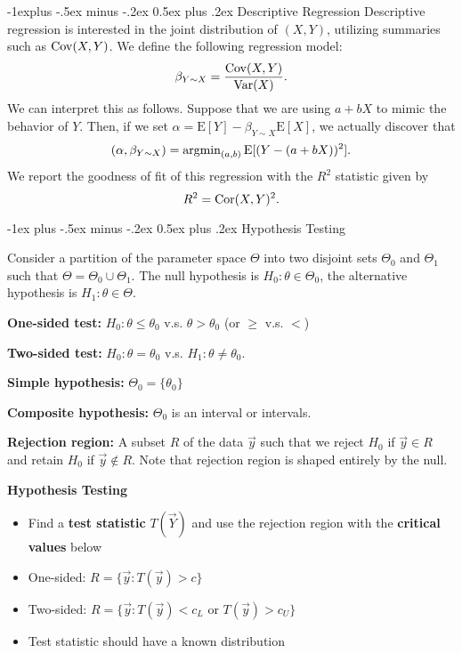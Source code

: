 \documentclass[10pt,landscape]{article}
\makeatletter
\renewcommand{\section}{\@startsection{section}{1}{0mm}%
                                {-1ex plus -.5ex minus -.2ex}%
                                {0.5ex plus .2ex}%
                                {\normalfont\large\bfseries}}
\renewcommand{\subsection}{\@startsection{subsection}{2}{0mm}%
                                {-1explus -.5ex minus -.2ex}%
                                {0.5ex plus .2ex}%
                                {\normalfont\normalsize\bfseries}}
\newcommand{\E}{\text{E}}
\makeatother
\begin{document}
\begin{multicols*}{3}
\subsection{Descriptive Regression}
Descriptive regression is interested
in the joint distribution of $(X,Y)$, utilizing summaries such as $\operatorname{Cov}(X, Y)$. We define the following regression model: $$\beta_{Y\sim X} =\frac{\operatorname{Cov}(X,Y)}{\operatorname{Var}( X)}.$$ We can interpret this as follows. Suppose that we are using $a + bX$ to mimic the behavior of $Y$. Then, if we set $\alpha = \E [Y] -\beta_{Y\sim X} \E [X]$, we actually discover that $$(\alpha,\beta_{Y\sim X})=\argmin_{(a,b)}\E [(Y-(a+bX))^2].$$ We report the goodness of fit of this regression with the $R^2$ statistic given by $$R^2=\operatorname{Cor}(X,Y)^2.$$

\section{Hypothesis Testing}

Consider a partition of the parameter space $\Theta$ into two disjoint sets $\Theta_0$ and $\Theta_1$ such that $\Theta=\Theta_0\cup \Theta_1$. The null hypothesis is $H_0:\theta\in\Theta_0$, the alternative hypothesis is $H_1:\theta\in\Theta$.

\textbf{One-sided test: }$H_0:\theta\leq\theta_0$ v.s. $\theta>\theta_0$ (or $\geq$ v.s. $<$)

\textbf{Two-sided test: }$H_0:\theta=\theta_0$ v.s. $H_1:\theta\neq\theta_0$.

\textbf{Simple hypothesis: }$\Theta_0=\{\theta_0\}$

\textbf{Composite hypothesis: }$\Theta_0$ is an interval or intervals.

\textbf{Rejection region:} A subset $R$ of the data $\vec{y}$ such that we reject $H_0$ if $\vec{y}\in R$ and retain $H_0$ if $\vec{y}\not\in R$. Note that rejection region is shaped entirely by the null.

\textbf{Hypothesis Testing}
\begin{itemize}
    \item Find a \textbf{test statistic} $T(\vec{Y})$ and use the rejection region with the \textbf{critical values} below
    \item One-sided: $R=\{\vec{y}:T(\vec{y})>c\}$
    \item Two-sided: $R=\{\vec{y}:T(\vec{y})<c_L\text{ or }T(\vec{y})>c_U\}$
    \item Test statistic should have a known distribution
\end{itemize}



\end{multicols*}
\end{document}
